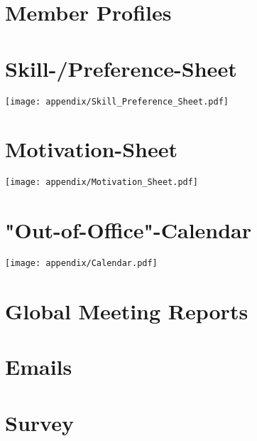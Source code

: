 \section{Member Profiles} 
\label{sec:member_profiles}








\section{Skill-/Preference-Sheet} \label{sec:Skill_Preference_Sheet}
\texttt{[image: appendix/Skill\_Preference\_Sheet.pdf]}

\section{Motivation-Sheet} 
\label{sec:Motivation_Sheet}
\texttt{[image: appendix/Motivation\_Sheet.pdf]}

\section{"Out-of-Office"-Calendar} 
\label{sec:Calendar}
\texttt{[image: appendix/Calendar.pdf]}

\section{Global Meeting Reports}








\section{Emails}

\section{Survey}
